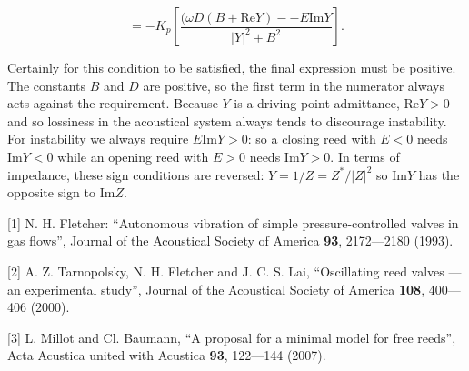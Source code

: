   $$=-K_p\left[\dfrac{(\omega D (B+\mathrm{Re} Y) -- E \mathrm{Im} 
  Y}{|Y|^2+B^2}\right] . \tag{23}$$ 

  Certainly for this condition to be satisfied, the final expression must be 
  positive. The constants $B$ and $D$ are positive, so the first term in the 
  numerator always acts against the requirement. Because $Y$ is a driving-point 
  admittance, $\mathrm{Re} Y > 0$ and so lossiness in the acoustical system 
  always tends to discourage instability. For instability we always require 
  $E\mathrm{Im} Y > 0$: so a closing reed with $E<0$ needs $\mathrm{Im} Y<0$ 
  while an opening reed with $E>0$ needs $\mathrm{Im} Y>0$. In terms of 
  impedance, these sign conditions are reversed: $Y=1/Z=Z^*/|Z|^2$ so 
  $\mathrm{Im} Y$ has the opposite sign to $\mathrm{Im} Z$. 

  \sectionreferences{}[1] N. H. Fletcher: “Autonomous vibration of simple 
  pressure-controlled valves in gas flows”, Journal of the Acoustical Society 
  of America \textbf{93}, 2172—2180 (1993). 

  [2] A. Z. Tarnopolsky, N. H. Fletcher and J. C. S. Lai, “Oscillating reed 
  valves — an experimental study”, Journal of the Acoustical Society of America 
  \textbf{108}, 400—406 (2000). 

  [3] L. Millot and Cl. Baumann, “A proposal for a minimal model for free 
  reeds”, Acta Acustica united with Acustica \textbf{93}, 122—144 (2007). 